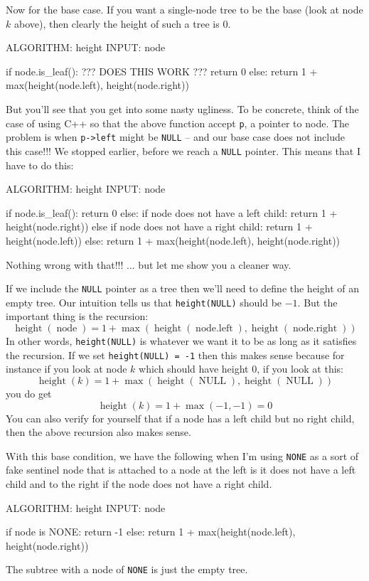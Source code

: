Now for the base case.
If you want a single-node tree to be the base (look at node $k$ above),
then clearly the height of such a tree is 0.
\begin{console}
ALGORITHM: height
INPUT:     node

if node.is_leaf(): ??? DOES THIS WORK ???
    return 0
else:
    return 1 + max(height(node.left), height(node.right))
\end{console}
But you'll see that you get into some nasty ugliness.
To be concrete, think of the case of using C++ so that 
the above function accept \verb!p!, a pointer to node.
The problem is when \verb!p->left! might be \verb!NULL! -- 
and our base case does not include this case!!!
We stopped earlier, before we reach a \verb!NULL! pointer.
This means that I have to do this:
\begin{console}
ALGORITHM: height
INPUT:     node

if node.is_leaf():
    return 0
else:
    if node does not have a left child:
        return 1 + height(node.right))
    else if node does not have a right child:
        return 1 + height(node.left))
    else: 
        return 1 + max(height(node.left), 
                       height(node.right))
\end{console}
Nothing wrong with that!!! ... 
but let me show you a cleaner way.

If we include the \verb!NULL! pointer as a tree
then we'll need to define the height of an empty tree.
Our intuition tells us that
\verb!height(NULL)! should be $-1$.
But the important thing is the recursion:
\[
\operatorname{height}(\operatorname{node}) = 1 + \max(
\operatorname{height}(\operatorname{node.left}),
\operatorname{height}(\operatorname{node.right}))
\]
In other words, \verb!height(NULL)! is whatever we want it to be
as long as it satisfies the recursion.
If we set \verb!height(NULL) = -1! then 
this makes sense because for instance if you look at node $k$
which should have height 0, if you look at this:
\[
\operatorname{height}(k) = 1 + \max(
\operatorname{height}(\operatorname{NULL}),
\operatorname{height}(\operatorname{NULL}))
\]
you do get
\[
\operatorname{height}(k) = 1 + \max(-1, -1) = 0
\]
You can also verify for yourself that if a node has a left child
but no right child, then the above recursion also makes sense.

With this base condition, we have the following when
I'm using \verb!NONE! as a sort of fake sentinel node
that is attached to a node at the left is it does not have a left child
and to the right if the node does not have a right child.
\begin{console}
ALGORITHM: height
INPUT:     node

if node is NONE:
    return -1
else:
    return 1 + max(height(node.left), height(node.right))
\end{console}
The subtree with a node of \verb!NONE! is just the empty tree.

